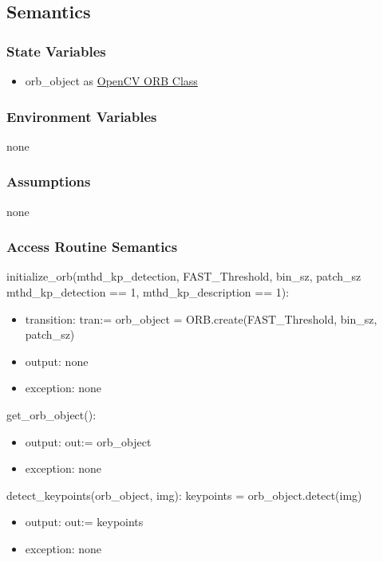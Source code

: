 \documentclass[12pt, titlepage]{article}
\begin{document}
\subsection{Semantics}

\subsubsection{State Variables}
\begin{itemize}
  \item orb\_object as \href{https://docs.opencv.org/3.4/db/d95/classcv_1_1ORB.html}{OpenCV ORB Class}
\end{itemize}

\subsubsection{Environment Variables}
none

\subsubsection{Assumptions}
none
\subsubsection{Access Routine Semantics}

\noindent initialize\_orb(mthd\_kp\_detection, FAST\_Threshold, bin\_sz, patch\_sz 
\textbar \: mthd\_kp\_detection == 1, mthd\_kp\_description == 1):
\begin{itemize}
  \item transition: tran:= orb\_object = ORB.create(FAST\_Threshold, bin\_sz, patch\_sz) 
  \item output: none
  \item exception: none
\end{itemize}
\noindent get\_orb\_object():
\begin{itemize}
  \item output: out:= orb\_object
  \item exception: none
\end{itemize}
\noindent detect\_keypoints(orb\_object, img):\newline\newline
keypoints = orb\_object.detect(img)
\begin{itemize}
  \item output: out:= keypoints
  \item exception: none
\end{itemize}
\end{document}
